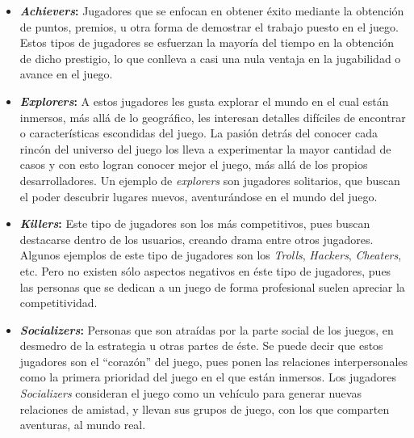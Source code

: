 \begin{itemize}
    \item {\bf \emph{Achievers}:}
        Jugadores que se enfocan en obtener éxito mediante la obtención de puntos,
        premios, u otra forma de demostrar el trabajo puesto en el juego.
        Estos tipos de jugadores se esfuerzan la mayoría del tiempo en la obtención
        de dicho prestigio, lo que conlleva a casi una nula ventaja en la
        jugabilidad o avance en el juego.

    \item {\bf \emph{Explorers}:}
        A estos jugadores les gusta explorar el mundo en el cual están inmersos,
        más allá de lo geográfico, les interesan detalles difíciles de encontrar o
        características escondidas del juego.
        La pasión detrás del conocer cada rincón del universo del juego los lleva
        a experimentar la mayor cantidad de casos y con esto logran conocer mejor
        el juego, más allá de los propios desarrolladores.
        Un ejemplo de \emph{explorers} son jugadores solitarios, que buscan el
        poder descubrir lugares nuevos, aventurándose en el mundo del juego.

    \item {\bf \emph{Killers}:}
        Este tipo de jugadores son los más competitivos, pues buscan destacarse
        dentro de los usuarios, creando drama entre otros jugadores.
        Algunos ejemplos de este tipo de jugadores son los \emph{Trolls},
        \emph{Hackers}, \emph{Cheaters}, etc.
        Pero no existen sólo aspectos negativos en éste tipo de jugadores,
        pues las personas que se dedican a un juego de forma profesional
        suelen apreciar la competitividad.

    \item {\bf \emph{Socializers}:}
        Personas que son atraídas por la parte social de los juegos,
        en desmedro de la estrategia u otras partes de éste.
        Se puede decir que estos jugadores son el ``corazón'' del juego,
        pues ponen las relaciones interpersonales como la primera prioridad
        del juego en el que están inmersos.
        Los jugadores \emph{Socializers} consideran el juego
        como un vehículo para generar nuevas relaciones de amistad, y llevan
        sus grupos de juego, con los que comparten aventuras, al mundo real.

\end{itemize}

